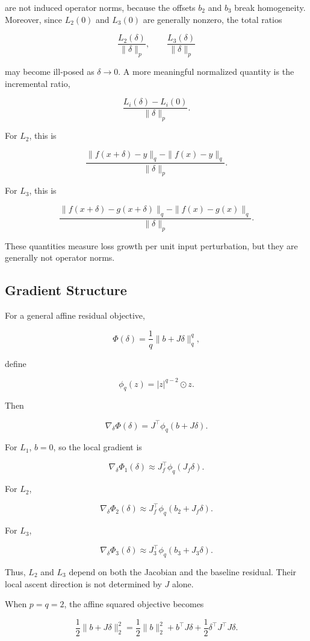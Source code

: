 \documentclass{article}
\begin{document}
are not induced operator norms, because the offsets \(b_2\) and \(b_3\) break homogeneity. Moreover, since \(L_2(0)\) and \(L_3(0)\) are generally nonzero, the total ratios

\[
\frac{L_2(\delta)}{\|\delta\|_p},
\qquad
\frac{L_3(\delta)}{\|\delta\|_p}
\]

may become ill-posed as \(\delta\to 0\). A more meaningful normalized quantity is the incremental ratio,

\[
\frac{L_i(\delta)-L_i(0)}{\|\delta\|_p}.
\]

For \(L_2\), this is

\[
\frac{
\|f(x+\delta)-y\|_q-\|f(x)-y\|_q
}{
\|\delta\|_p
}.
\]

For \(L_3\), this is

\[
\frac{
\|f(x+\delta)-g(x+\delta)\|_q
-
\|f(x)-g(x)\|_q
}{
\|\delta\|_p
}.
\]

These quantities measure loss growth per unit input perturbation, but they are generally not operator norms.

\subsection{Gradient Structure}

For a general affine residual objective,

\[
\Phi(\delta)
=
\frac{1}{q}\|b+J\delta\|_q^q,
\]

define

\[
\phi_q(z)
=
|z|^{q-2}\odot z.
\]

Then

\[
\nabla_\delta \Phi(\delta)
=
J^\top \phi_q(b+J\delta).
\]

For \(L_1\), \(b=0\), so the local gradient is

\[
\nabla_\delta \Phi_1(\delta)
\approx
J_f^\top \phi_q(J_f\delta).
\]

For \(L_2\),

\[
\nabla_\delta \Phi_2(\delta)
\approx
J_f^\top \phi_q(b_2+J_f\delta).
\]

For \(L_3\),

\[
\nabla_\delta \Phi_3(\delta)
\approx
J_3^\top \phi_q(b_3+J_3\delta).
\]

Thus, \(L_2\) and \(L_3\) depend on both the Jacobian and the baseline residual. Their local ascent direction is not determined by \(J\) alone.

When \(p=q=2\), the affine squared objective becomes

\[
\frac12\|b+J\delta\|_2^2
=
\frac12\|b\|_2^2
+
b^\top J\delta
+
\frac12\delta^\top J^\top J\delta.
\]
\end{document}
